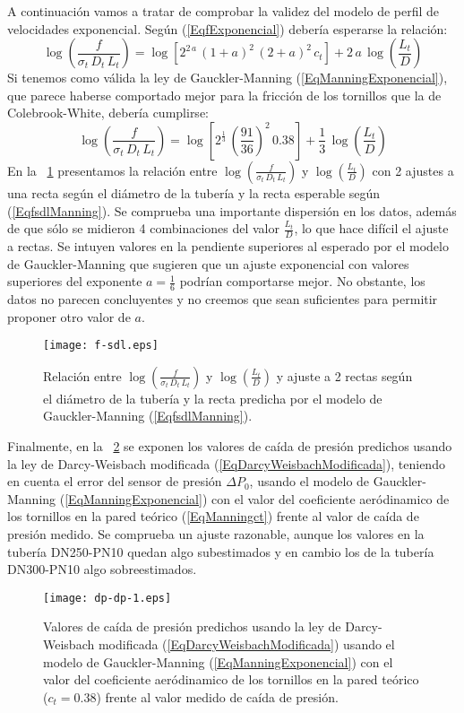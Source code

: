 \documentclass[a4paper]{article}
\newcommand{\EQ}[2]{\begin{equation}#1\label{#2}\end{equation}}
\begin{document}
A continuación vamos a tratar de comprobar la validez del modelo de perfil de
velocidades exponencial. Según (\ref{EqfExponencial}) debería esperarse la
relación:
\EQ
{
  \log\left(\frac{f}{\sigma_t\,D_t\,L_t}\right)=
  \log\left[2^{2\,a}\,(1+a)^2\,(2+a)^2\,c_t\right]
  +2\,a\,\log\left(\frac{L_t}{D}\right)
}{Eqfsdl}
Si tenemos como válida la ley de Gauckler-Manning
(\ref{EqManningExponencial}), que parece haberse comportado mejor para la
fricción de los tornillos que la de Colebrook-White, debería cumplirse:
\EQ
{
  \log\left(\frac{f}{\sigma_t\,D_t\,L_t}\right)=
  \log\left[2^{\frac13}\,\left(\frac{91}{36}\right)^2\,0.38\right]
  +\frac13\,\log\left(\frac{L_t}{D}\right)
}{EqfsdlManning}
En la \figurename~\ref{Figfsdl} presentamos la relación entre
$\log\left(\frac{f}{\sigma_t\,D_t\,L_t}\right)$ y
$\log\left(\frac{L_t}{D}\right)$ con 2 ajustes a una recta según el diámetro de
la tubería y la recta esperable según (\ref{EqfsdlManning}). Se comprueba una
importante dispersión en los datos, además de que sólo se midieron 4
combinaciones del valor $\frac{L_t}{D}$, lo que hace difícil el ajuste a rectas.
Se intuyen valores en la pendiente superiores al esperado por el modelo de
Gauckler-Manning que sugieren que un ajuste exponencial con valores superiores
del exponente $a=\frac16$ podrían comportarse mejor. No obstante, los datos no
parecen concluyentes y no creemos que sean suficientes para permitir proponer
otro valor de $a$.
\begin{figure}[ht!]
\centering
\texttt{[image: f-sdl.eps]}
\caption
{
  Relación entre $\log\left(\frac{f}{\sigma_t\,D_t\,L_t}\right)$ y
  $\log\left(\frac{L_t}{D}\right)$ y ajuste a 2 rectas según el diámetro de la
  tubería y la recta predicha por el modelo de Gauckler-Manning
  (\ref{EqfsdlManning}).\label{Figfsdl}
}
\end{figure}

Finalmente, en la \figurename~\ref{Figdpdp} se exponen los valores de caída de
presión predichos usando la ley de Darcy-Weisbach modificada
(\ref{EqDarcyWeisbachModificada}), teniendo en cuenta el error del sensor
de presión $\Delta P_0$, usando el modelo de Gauckler-Manning
(\ref{EqManningExponencial}) con el valor del coeficiente aeródinamico de los
tornillos en la pared teórico (\ref{EqManningct}) frente al valor de caída de
presión medido. Se comprueba un ajuste razonable, aunque los valores en la
tubería DN250-PN10 quedan algo subestimados y en cambio los de la tubería
DN300-PN10 algo sobreestimados.
\begin{figure}[ht!]
\centering
\texttt{[image: dp-dp-1.eps]}
\caption
{
  Valores de caída de presión predichos usando la ley de Darcy-Weisbach
  modificada (\ref{EqDarcyWeisbachModificada}) usando el modelo de
  Gauckler-Manning (\ref{EqManningExponencial}) con el valor del coeficiente
  aeródinamico de los tornillos en la pared teórico ($c_t=0.38$) frente al
  valor medido de caída de presión.\label{Figdpdp}
}
\end{figure}
\end{document}
